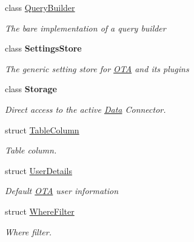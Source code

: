 \begin{DoxyCompactItemize}
class \hyperlink{class_o_t_a_1_1_data_1_1_query_builder}{Query\+Builder}
\begin{DoxyCompactList}\small\item\em The bare implementation of a query builder \end{DoxyCompactList}\item 
class {\bfseries Settings\+Store}
\begin{DoxyCompactList}\small\item\em The generic setting store for \hyperlink{namespace_o_t_a}{O\+T\+A} and its plugins \end{DoxyCompactList}\item 
class {\bfseries Storage}
\begin{DoxyCompactList}\small\item\em Direct access to the active \hyperlink{namespace_o_t_a_1_1_data}{Data} Connector. \end{DoxyCompactList}\item 
struct \hyperlink{struct_o_t_a_1_1_data_1_1_table_column}{Table\+Column}
\begin{DoxyCompactList}\small\item\em Table column. \end{DoxyCompactList}\item 
struct \hyperlink{struct_o_t_a_1_1_data_1_1_user_details}{User\+Details}
\begin{DoxyCompactList}\small\item\em Default \hyperlink{namespace_o_t_a}{O\+T\+A} user information \end{DoxyCompactList}\item 
struct \hyperlink{struct_o_t_a_1_1_data_1_1_where_filter}{Where\+Filter}
\begin{DoxyCompactList}\small\item\em Where filter. \end{DoxyCompactList}\end{DoxyCompactItemize}
